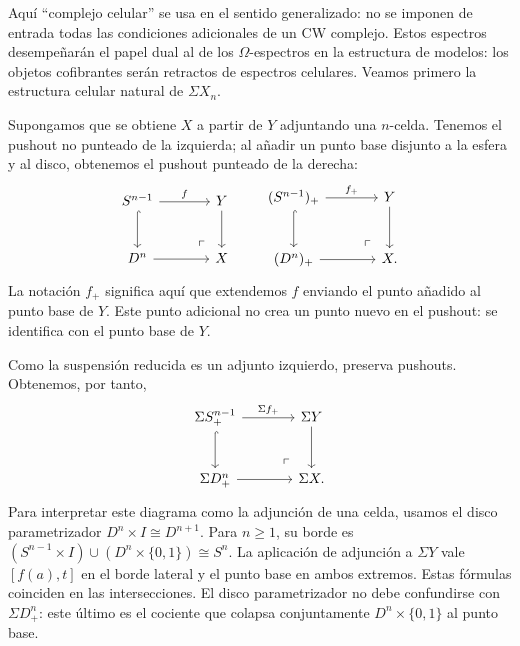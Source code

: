 Aquí ``complejo celular'' se usa en el sentido generalizado: no se imponen de entrada todas las condiciones adicionales de un CW complejo. Estos espectros desempeñarán el papel dual al de los $\Omega$-espectros en la estructura de modelos: los objetos cofibrantes serán retractos de espectros celulares. Veamos primero la estructura celular natural de $\Sigma X_n$.

Supongamos que se obtiene $X$ a partir de $Y$ adjuntando una $n$-celda. Tenemos el pushout no punteado de la izquierda; al añadir un punto base disjunto a la esfera y al disco, obtenemos el pushout punteado de la derecha:
\[
\begin{tikzcd}[column sep=large,row sep=large]
S^{n-1} \arrow[r,"f"] \arrow[d,hook]
& Y \arrow[d]\\
D^n \arrow[r] & X \arrow[ul,phantom,"\ulcorner",very near start]
\end{tikzcd}
\qquad
\begin{tikzcd}[column sep=large,row sep=large]
(S^{n-1})_+ \arrow[r,"f_+"] \arrow[d,hook]
& Y \arrow[d]\\
(D^n)_+ \arrow[r] & X \arrow[ul,phantom,"\ulcorner",very near start].
\end{tikzcd}
\]
La notación $f_+$ significa aquí que extendemos $f$ enviando el punto añadido al punto base de $Y$. Este punto adicional no crea un punto nuevo en el pushout: se identifica con el punto base de $Y$.

Como la suspensión reducida es un adjunto izquierdo, preserva pushouts. Obtenemos, por tanto,
\[
\begin{tikzcd}[column sep=large,row sep=large]
\Sigma S^{n-1}_+ \arrow[r,"\Sigma f_+"] \arrow[d,hook]
& \Sigma Y \arrow[d]\\
\Sigma D^n_+ \arrow[r]
& \Sigma X \arrow[ul,phantom,"\ulcorner",very near start].
\end{tikzcd}
\]
Para interpretar este diagrama como la adjunción de una celda, usamos el disco parametrizador $D^n\times I\cong D^{n+1}$. Para $n\ge1$, su borde es $(S^{n-1}\times I)\cup(D^n\times\{0,1\})\cong S^n$. La aplicación de adjunción a $\Sigma Y$ vale $[f(a),t]$ en el borde lateral y el punto base en ambos extremos. Estas fórmulas coinciden en las intersecciones. El disco parametrizador no debe confundirse con $\Sigma D^n_+$: este último es el cociente que colapsa conjuntamente $D^n\times\{0,1\}$ al punto base.

